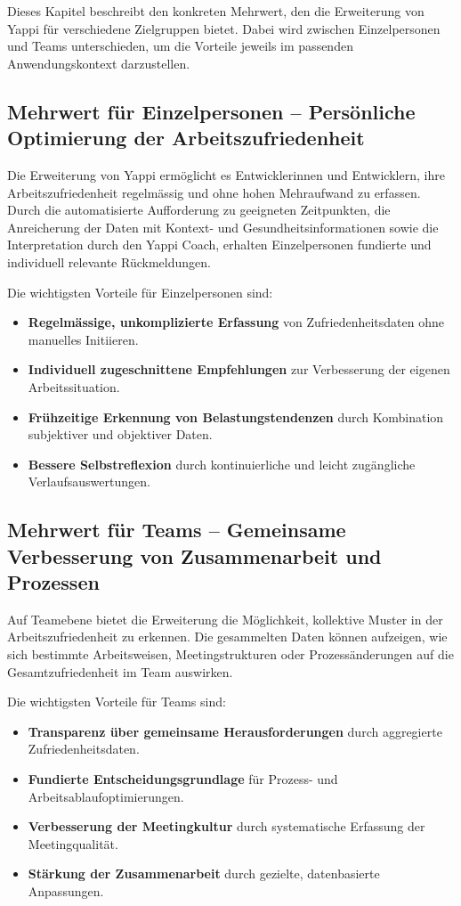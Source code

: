 \documentclass[12pt,a4paper]{report}
\begin{document}
Dieses Kapitel beschreibt den konkreten Mehrwert, den die Erweiterung von Yappi für verschiedene Zielgruppen bietet. 
Dabei wird zwischen Einzelpersonen und Teams unterschieden, um die Vorteile jeweils im passenden Anwendungskontext darzustellen.

\subsection{Mehrwert für Einzelpersonen – Persönliche Optimierung der Arbeitszufriedenheit}

Die Erweiterung von Yappi ermöglicht es Entwicklerinnen und Entwicklern, ihre Arbeitszufriedenheit regelmässig und ohne hohen 
Mehraufwand zu erfassen. Durch die automatisierte Aufforderung zu geeigneten Zeitpunkten, die Anreicherung der Daten mit Kontext- 
und Gesundheitsinformationen sowie die Interpretation durch den Yappi Coach, erhalten Einzelpersonen fundierte und individuell 
relevante Rückmeldungen.  

Die wichtigsten Vorteile für Einzelpersonen sind:
\begin{itemize}
    \item \textbf{Regelmässige, unkomplizierte Erfassung} von Zufriedenheitsdaten ohne manuelles Initiieren.
    \item \textbf{Individuell zugeschnittene Empfehlungen} zur Verbesserung der eigenen Arbeitssituation.
    \item \textbf{Frühzeitige Erkennung von Belastungstendenzen} durch Kombination subjektiver und objektiver Daten.
    \item \textbf{Bessere Selbstreflexion} durch kontinuierliche und leicht zugängliche Verlaufsauswertungen.
\end{itemize}

\subsection{Mehrwert für Teams – Gemeinsame Verbesserung von Zusammenarbeit und Prozessen}

Auf Teamebene bietet die Erweiterung die Möglichkeit, kollektive Muster in der Arbeitszufriedenheit zu erkennen. Die gesammelten
Daten können aufzeigen, wie sich bestimmte Arbeitsweisen, Meetingstrukturen oder Prozessänderungen auf die Gesamtzufriedenheit im
Team auswirken.  

Die wichtigsten Vorteile für Teams sind:
\begin{itemize}
    \item \textbf{Transparenz über gemeinsame Herausforderungen} durch aggregierte Zufriedenheitsdaten.
    \item \textbf{Fundierte Entscheidungsgrundlage} für Prozess- und Arbeitsablaufoptimierungen.
    \item \textbf{Verbesserung der Meetingkultur} durch systematische Erfassung der Meetingqualität.
    \item \textbf{Stärkung der Zusammenarbeit} durch gezielte, datenbasierte Anpassungen.
\end{itemize}
\end{document}
